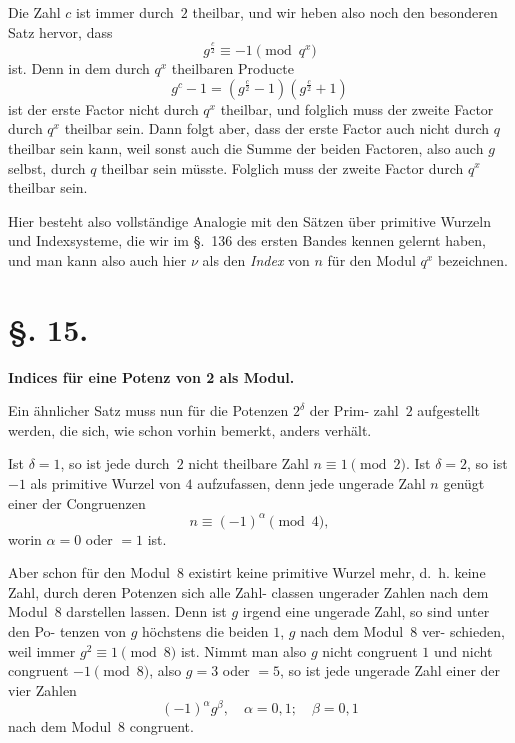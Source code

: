 \documentclass[12pt,a4paper]{article}
\theoremstyle{plain}
\theoremstyle{definition}
\theoremstyle{remark}
\begin{document}
Die Zahl $c$ ist immer durch~$2$ theilbar, und wir heben also
noch den besonderen Satz hervor, dass
\begin{equation}\tag{11}
g^{\frac{c}{2}} \equiv -1 \pmod{q^x}
\end{equation}
ist. Denn in dem durch $q^x$ theilbaren Producte
\[
g^c - 1 = (g^{\frac{c}{2}} - 1)(g^{\frac{c}{2}} + 1)
\]
ist der erste Factor nicht durch $q^x$ theilbar, und folglich muss
der zweite Factor durch $q^x$ theilbar sein. Dann folgt aber, dass
der erste Factor auch nicht durch $q$ theilbar sein kann, weil
sonst auch die Summe der beiden Factoren, also auch $g$ selbst,
durch $q$ theilbar sein müsste. Folglich muss der zweite Factor
durch $q^x$ theilbar sein.

Hier besteht also vollständige Analogie mit den Sätzen über
primitive Wurzeln und Indexsysteme, die wir im \S.~136 des
ersten Bandes kennen gelernt haben, und man kann also auch
hier $\nu$ als den \emph{Index} von $n$ für den Modul $q^x$ bezeichnen.


\section*{\S. 15.}
\begin{center}
\textbf{Indices für eine Potenz von 2 als Modul.}
\end{center}

Ein ähnlicher Satz muss nun für die Potenzen $2^\delta$ der Prim-
zahl~$2$ aufgestellt werden, die sich, wie schon vorhin bemerkt,
anders verhält.

Ist $\delta = 1$, so ist jede durch~$2$ nicht theilbare Zahl
$n \equiv 1 \pmod{2}$. Ist $\delta = 2$, so ist $-1$ als primitive Wurzel von
$4$ aufzufassen, denn jede ungerade Zahl $n$ genügt einer der
Congruenzen
\[
n \equiv (-1)^\alpha \pmod{4},
\]
worin $\alpha = 0$ oder $= 1$ ist.

Aber schon für den Modul~$8$ existirt keine primitive Wurzel
mehr, d.~h. keine Zahl, durch deren Potenzen sich alle Zahl-
classen ungerader Zahlen nach dem Modul~$8$ darstellen lassen.
Denn ist $g$ irgend eine ungerade Zahl, so sind unter den Po-
tenzen von $g$ höchstens die beiden $1$, $g$ nach dem Modul~$8$ ver-
schieden, weil immer $g^2 \equiv 1 \pmod{8}$ ist. Nimmt man also $g$
nicht congruent $1$ und nicht congruent $-1 \pmod{8}$, also $g = 3$
oder $= 5$, so ist jede ungerade Zahl einer der vier Zahlen
\begin{equation}\tag{}
(-1)^\alpha g^\beta, \quad \alpha = 0, 1; \quad \beta = 0, 1
\end{equation}
nach dem Modul~$8$ congruent.
\end{document}
